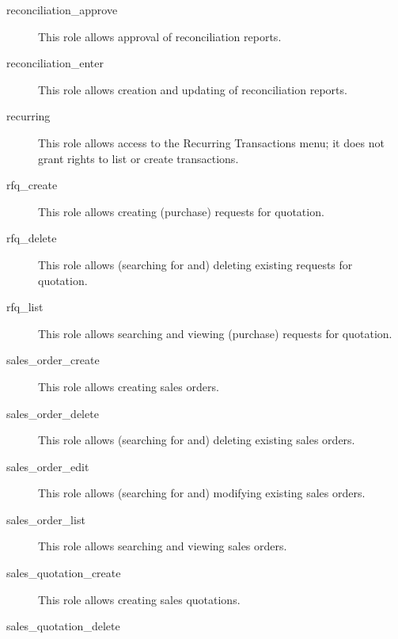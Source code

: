 \begin{description}
\item [reconciliation\_approve] \htmlspacing 
                         This role allows approval of reconciliation reports.
\item [reconciliation\_enter] \htmlspacing 
                         This role allows creation and updating of reconciliation reports.
\item [recurring] \htmlspacing 
                         This role allows access to the Recurring Transactions
                         menu; it does not grant rights to list or create
                         transactions.
\item [rfq\_create] \htmlspacing 
                         This role allows creating (purchase) requests for quotation.
\item [rfq\_delete] \htmlspacing 
                         This role allows (searching for and) deleting existing requests for quotation.
\item [rfq\_list] \htmlspacing 
                         This role allows searching and viewing (purchase) requests for quotation.
\item [sales\_order\_create] \htmlspacing 
                         This role allows creating sales orders.
\item [sales\_order\_delete] \htmlspacing 
                         This role allows (searching for and) deleting existing sales orders.
\item [sales\_order\_edit] \htmlspacing 
                         This role allows (searching for and) modifying existing sales orders.
\item [sales\_order\_list] \htmlspacing 
                         This role allows searching and viewing sales orders.
\item [sales\_quotation\_create] \htmlspacing 
                         This role allows creating sales quotations.
\item [sales\_quotation\_delete] \htmlspacing 

\end{description}
